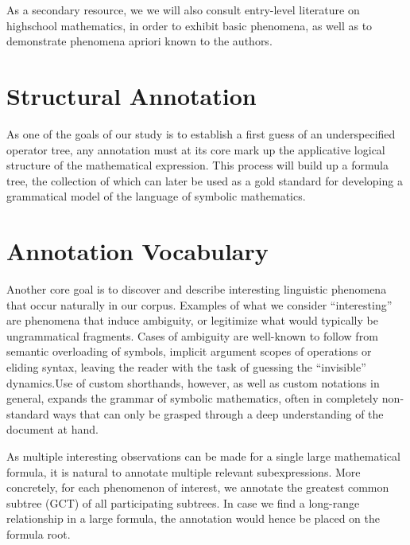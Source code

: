 As a secondary resource, we we will also consult entry-level literature on highschool mathematics, in order to exhibit basic phenomena, as well as to demonstrate phenomena apriori known to the authors.

\section{Structural Annotation}

As one of the goals of our study is to establish a first guess of an underspecified operator tree, any annotation must at its core mark up the applicative logical structure of the mathematical expression. This process will build up a formula tree, the collection of which can later be used as a gold standard for developing a grammatical model of the language of symbolic mathematics.


\section{Annotation Vocabulary}

Another core goal is to discover and describe interesting linguistic phenomena that occur naturally in our corpus. Examples of what we consider ``interesting'' are phenomena that induce ambiguity, or legitimize what would typically be ungrammatical fragments. Cases of ambiguity are well-known to follow from semantic overloading of symbols, implicit argument scopes of operations or eliding syntax, leaving the reader with the task of guessing the ``invisible'' dynamics.Use of custom shorthands, however, as well as custom notations in general, expands the grammar of symbolic mathematics, often in completely non-standard ways that can only be grasped through a deep understanding of the document at hand.

As multiple interesting observations can be made for a single large mathematical formula, it is natural to annotate multiple relevant subexpressions. More concretely, for each phenomenon of interest, we annotate the greatest common subtree (GCT) of all participating subtrees. In case we find a long-range relationship in a large formula, the annotation would hence be placed on the formula root.

